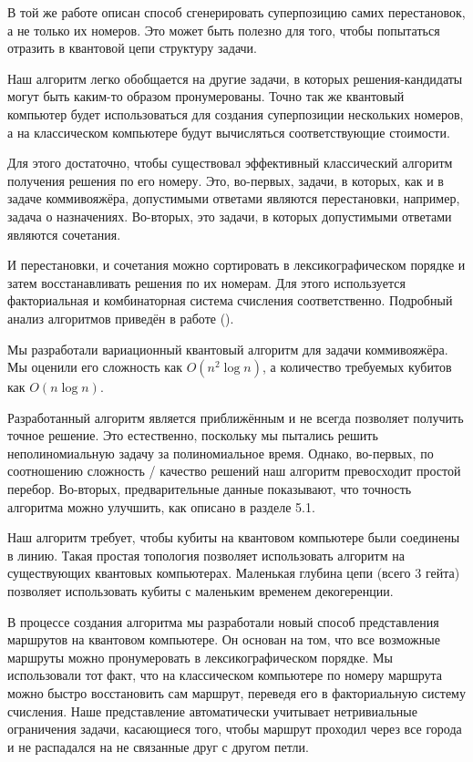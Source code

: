 В той же работе \cite{perms} описан способ сгенерировать суперпозицию самих перестановок, а не только их номеров. Это может быть полезно для того, чтобы попытаться отразить в квантовой цепи структуру задачи.


Наш алгоритм легко обобщается на другие задачи, в которых решения-кандидаты могут быть каким-то образом пронумерованы. Точно так же квантовый компьютер будет использоваться для создания суперпозиции нескольких номеров, а на классическом компьютере будут вычисляться соответствующие стоимости.

Для этого достаточно, чтобы существовал эффективный классический алгоритм получения решения по его номеру. Это, во-первых, задачи, в которых, как и в задаче коммивояжёра, допустимыми ответами являются перестановки, например, задача о назначениях. Во-вторых, это задачи, в которых допустимыми ответами являются сочетания. 

И перестановки, и сочетания можно сортировать в лексикографическом порядке и затем восстанавливать решения по их номерам. 
Для этого используется факториальная и комбинаторная система счисления соответственно.
Подробный анализ алгоритмов приведён в работе \cite{Combinations} (\citeyear{Combinations}).


Мы разработали вариационный квантовый алгоритм для задачи коммивояжёра. Мы оценили его сложность как $O(n^2 \log n)$, а количество требуемых кубитов как $O(n \log n)$.

Разработанный алгоритм является приближённым и не всегда позволяет получить точное решение. 
Это естественно, поскольку мы пытались решить неполиномиальную задачу за полиномиальное время. 
Однако, во-первых, по соотношению сложность / качество решений наш алгоритм превосходит простой перебор. 
Во-вторых, предварительные данные показывают, что точность алгоритма можно улучшить, как описано в разделе 5.1.

Наш алгоритм требует, чтобы кубиты на квантовом компьютере были соединены в линию. Такая простая топология позволяет использовать алгоритм на существующих квантовых компьютерах. Маленькая глубина цепи (всего 3 гейта) позволяет использовать кубиты с маленьким временем декогеренции. 

В процессе создания алгоритма мы разработали новый способ представления маршрутов на квантовом компьютере.
Он основан на том, что все возможные маршруты можно пронумеровать в лексикографическом порядке.
Мы использовали тот факт, что на классическом компьютере по номеру маршрута можно быстро восстановить сам маршрут, переведя его в факториальную систему счисления.
Наше представление автоматически учитывает нетривиальные ограничения задачи, касающиеся того, чтобы маршрут проходил через все города и не распадался на не связанные друг с другом петли.

